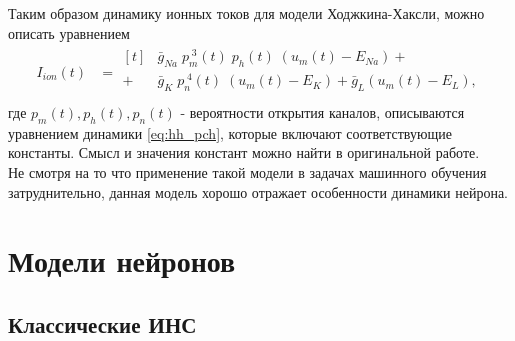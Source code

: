 \documentclass[a4paper,10pt]{article}
\begin{document}
	\indent Таким образом динамику ионных токов для модели Ходжкина-Хаксли, можно описать уравнением
	\begin{align}\label{eq:hh_ion}
	I_{ion}(t) &= \begin{aligned}[t]
	&\bar{g}_{Na}\;p_{m}^{\;3}(t)\;p_{h}(t)\;(u_{m}(t)-E_{Na}) +	\\
	+\;&\bar{g}_{K}\;p_{n}^{\;4}(t)\;(u_{m}(t)-E_{K})+\bar{g}_{L}(u_{m}(t)-E_{L}),	\\
	\end{aligned}	
	\end{align}
	где $p_{m}(t), p_{h}(t), p_{n}(t)$ - вероятности открытия каналов, описываются уравнением динамики \eqref{eq:hh_pch}, которые включают соответствующие константы. Смысл и значения констант можно найти в оригинальной работе\cite{HH}.\\
	\indent Не смотря на то что применение такой модели в задачах машинного обучения затруднительно, данная модель хорошо отражает особенности динамики нейрона.

\section{Модели нейронов}
\subsection{Классические ИНС}
\end{document}
